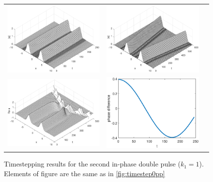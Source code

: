 \documentclass[12pt]{elsarticle}
\begin{document}
\begin{figure}[H]
\centering
\begin{tabular}{ccc}
\includegraphics[width=8cm]{images/DP1ppwaterfall} &
\includegraphics[width=8cm]{images/DP1ppstretchwaterfall} \\
\includegraphics[width=8cm]{images/DP1ppphasewaterfall} &
\includegraphics[width=6cm]{images/DP1ppphasedifference}
\end{tabular}
\caption{Timestepping results for the second in-phase double pulse ($k_1 = 1$). Elements of figure are the same as in \cref{fig:timestep0pp}  }
\label{fig:timestep1pp}
\end{figure}
\end{document}

